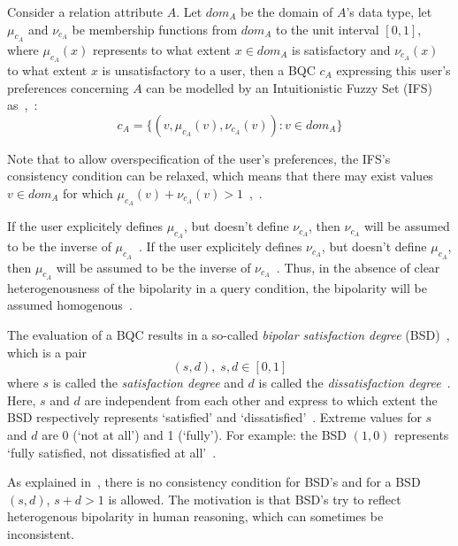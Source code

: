 \documentclass[runningheads,a4paper]{llncs}
\begin{document}
Consider a relation attribute $A$. Let $dom_{A}$ be the domain of $A$'s data type, let $\mu_{c_{A}}$ and $\nu_{c_{A}}$ be membership functions from $dom_{A}$ to the unit interval $\left[0, 1\right]$, where $\mu_{c_{A}}(x)$ represents to what extent $x \in dom_{A}$ is satisfactory and $\nu_{c_{A}}(x)$ to what extent $x$ is unsatisfactory to a user, then a BQC $c_{A}$ expressing this user's preferences concerning $A$ can be modelled by an Intuitionistic Fuzzy Set (IFS)~\cite{Atanassov1986fss} as~\cite{DeTre2010ieeetfs},~\cite{Matthe2011ijis}:
\vspace{-5pt}
\begin{equation}
c_{A} = \{(v, \mu_{c_{A}}(v), \nu_{c_{A}}(v)) : v \in dom_{A}\}
\end{equation}

Note that to allow overspecification of the user's preferences, the IFS's consistency condition can be relaxed, which means that there may exist values $v \in dom_{A}$ for which $\mu_{c_{A}}(v) + \nu_{c_{A}}(v) > 1$~\cite{DeTre2010ieeetfs},~\cite{Matthe2011ijis}.

If the user explicitely defines $\mu_{c_{A}}$, but doesn't define $\nu_{c_{A}}$, then $\nu_{c_{A}}$ will be assumed to be the inverse of $\mu_{c_{A}}$~\cite{Matthe2011ijis}. If the user explicitely defines $\nu_{c_{A}}$, but doesn't define $\mu_{c_{A}}$, then $\mu_{c_{A}}$ will be assumed to be the inverse of $\nu_{c_{A}}$~\cite{Matthe2011ijis}. Thus, in the absence of clear heterogenousness of the bipolarity in a query condition, the bipolarity will be assumed homogenous~\cite{Matthe2011ijis}.

The evaluation of a BQC results in a so-called {\em bipolar satisfaction degree} (BSD)~\cite{Matthe2011ijis}, which is a pair
\vspace{-10pt}
\begin{equation}
(s,d),\; s,d \in [0,1] \nonumber
\end{equation}
where $s$ is called the \emph{satisfaction degree} and $d$ is called the \emph{dissatisfaction degree}~\cite{Matthe2011ijis}. Here, $s$ and $d$ are independent from each other and express to which extent the BSD respectively represents `satisfied' and `dissatisfied'~\cite{Matthe2011ijis}. Extreme values for $s$ and $d$ are 0 (`not at all') and 1 (`fully'). For example: the BSD $(1,0)$ represents `fully satisfied, not dissatisfied at all'~\cite{Matthe2011ijis}.

As explained in~\cite{Matthe2011ijis}, there is no consistency condition for BSD's and for a BSD $(s, d)$, $s+d>1$ is allowed. The motivation is that BSD's try to reflect heterogenous bipolarity in human reasoning, which can sometimes be inconsistent.
\end{document}
